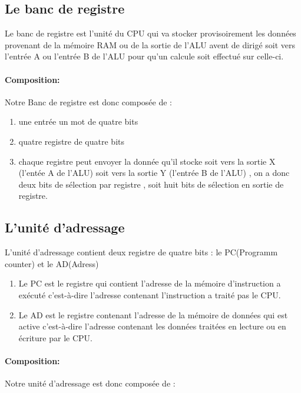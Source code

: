 
\subsection{Le banc de registre}
\label{sec:re-banc}
Le banc de registre est l'unité du CPU qui va stocker provisoirement les données provenant de la mémoire RAM ou de la sortie de l'ALU avent de dirigé soit vers l'entrée A ou l'entrée B de l'ALU pour qu'un calcule soit effectué sur celle-ci.

\paragraph{Composition:} Notre Banc de registre est donc composée de :

\begin{enumerate}
\item une entrée un mot de quatre bits
\item quatre registre de quatre bits
\item chaque registre peut envoyer la donnée qu'il stocke soit vers la sortie X (l'entée A de l'ALU) soit vers la sortie Y (l'entrée B de l'ALU) , on a donc deux bits de sélection par registre , soit huit bits de sélection en sortie de registre.
\end{enumerate}


\clearpage
\subsection{L'unité d'adressage}
\label{sec:re-unité adressage}
L'unité d'adressage contient deux registre de quatre bits : le PC(Programm counter) et le AD(Adress)
\begin{enumerate}
\item Le PC est le registre qui contient l'adresse de la mémoire d'instruction a exécuté c'est-à-dire l'adresse contenant l'instruction a traité pas le CPU.
\item Le AD est le registre contenant l'adresse de la mémoire de données qui est active c'est-à-dire l'adresse contenant les données traitées en lecture ou en écriture par le CPU.
\end{enumerate}

\paragraph{Composition:} Notre unité d'adressage est donc composée de :

